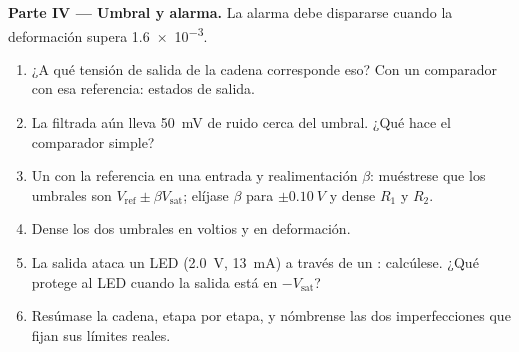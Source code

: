\begin{problem}
\medskip
\noindent\textbf{Parte IV --- Umbral y alarma.}
La alarma debe dispararse cuando la deformación supera \num{1.6e-3}.
\begin{enumerate}[resume]
  \item ¿A qué tensión de salida de la cadena corresponde eso? Con un
        comparador con esa referencia: estados de salida.
  \item La  filtrada aún lleva \qty{50}{mV} de ruido cerca del
        umbral. ¿Qué hace el comparador simple?
  \item Un  con la referencia en una entrada y
        realimentación $\beta$: muéstrese que los umbrales son
        $V_{\mathrm{ref}} \pm
        \beta V_{\mathrm{sat}}$; elíjase $\beta$ para $\pm\qty{0.10}{V}$
        y dense $R_1$ y $R_2$.
  \item Dense los dos umbrales en voltios y en deformación.
  \item La salida ataca un LED (\qty{2.0}{V}, \qty{13}{mA}) a través de un
        : calcúlese. ¿Qué protege al LED cuando la salida está en
        $-V_{\mathrm{sat}}$?
  \item Resúmase la cadena, etapa por etapa, y nómbrense las dos
        imperfecciones que fijan sus límites reales.
\end{enumerate}
\end{problem}

